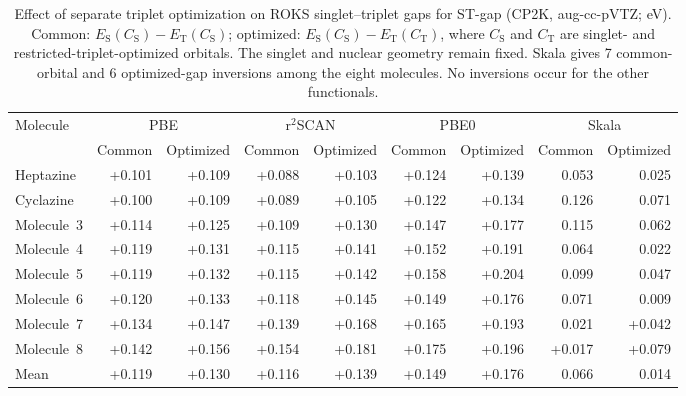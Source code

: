 \begin{table}[htbp]
\centering
\caption{Effect of separate triplet optimization on ROKS singlet--triplet gaps for ST-gap (CP2K, aug-cc-pVTZ; eV). Common: $E_{\mathrm S}(C_{\mathrm S})-E_{\mathrm T}(C_{\mathrm S})$; optimized: $E_{\mathrm S}(C_{\mathrm S})-E_{\mathrm T}(C_{\mathrm T})$, where $C_{\mathrm S}$ and $C_{\mathrm T}$ are singlet- and restricted-triplet-optimized orbitals. The singlet and nuclear geometry remain fixed. Skala gives 7 common-orbital and 6 optimized-gap inversions among the eight molecules. No inversions occur for the other functionals.}
\label{tab:si_triplet_relaxation}
\footnotesize
\setlength{\tabcolsep}{4pt}
\begin{tabular}{@{}lrrrrrrrr@{}}
\hline\hline
Molecule & \multicolumn{2}{c}{PBE} & \multicolumn{2}{c}{r$^2$SCAN} & \multicolumn{2}{c}{PBE0} & \multicolumn{2}{c}{Skala} \\
\cline{2-3}\cline{4-5}\cline{6-7}\cline{8-9}
 & Common & Optimized & Common & Optimized & Common & Optimized & Common & Optimized \\
\hline
Heptazine & +0.101 & +0.109 & +0.088 & +0.103 & +0.124 & +0.139 & \textminus{}0.053 & \textminus{}0.025 \\
Cyclazine & +0.100 & +0.109 & +0.089 & +0.105 & +0.122 & +0.134 & \textminus{}0.126 & \textminus{}0.071 \\
Molecule~3 & +0.114 & +0.125 & +0.109 & +0.130 & +0.147 & +0.177 & \textminus{}0.115 & \textminus{}0.062 \\
Molecule~4 & +0.119 & +0.131 & +0.115 & +0.141 & +0.152 & +0.191 & \textminus{}0.064 & \textminus{}0.022 \\
Molecule~5 & +0.119 & +0.132 & +0.115 & +0.142 & +0.158 & +0.204 & \textminus{}0.099 & \textminus{}0.047 \\
Molecule~6 & +0.120 & +0.133 & +0.118 & +0.145 & +0.149 & +0.176 & \textminus{}0.071 & \textminus{}0.009 \\
Molecule~7 & +0.134 & +0.147 & +0.139 & +0.168 & +0.165 & +0.193 & \textminus{}0.021 & +0.042 \\
Molecule~8 & +0.142 & +0.156 & +0.154 & +0.181 & +0.175 & +0.196 & +0.017 & +0.079 \\
\hline
Mean & +0.119 & +0.130 & +0.116 & +0.139 & +0.149 & +0.176 & \textminus{}0.066 & \textminus{}0.014 \\
\hline\hline
\end{tabular}
\end{table}
